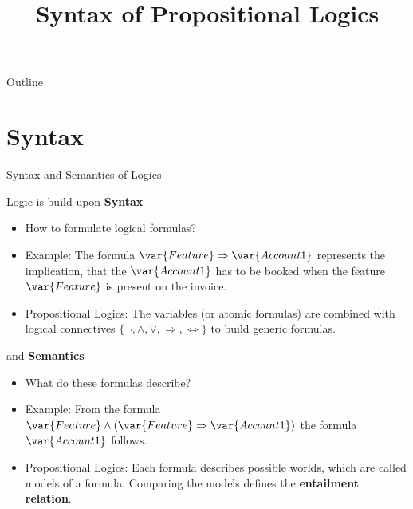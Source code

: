 \documentclass{beamer}
\title[Syntax of Propositional Logics]{
    \coursechapterone \\
    {\huge Syntax of Propositional Logics}
}
\begin{document}
{\frame[plain]{\titlepage}}
    \begin{frame}{Outline}
        \tableofcontents
    \end{frame}

    \addtocounter{framenumber}{-1}


        \section{Syntax}

    \begin{frame}{Syntax and Semantics of Logics}

        Logic is build upon
        \textbf{Syntax}
        \begin{itemize}
            \item How to formulate logical formulas?
            \item Example: The formula $\var{Feature}\Rightarrow\var{Account 1}$ represents the implication, that the $\var{Account 1}$ has to be booked when the feature $\var{Feature}$ is present on the invoice.
            \item Propositional Logics: The variables (or atomic formulas) are combined with logical connectives $\{\lnot, \land, \lor, \Rightarrow, \Leftrightarrow\}$ to build generic formulas.
        \end{itemize}
        and \textbf{Semantics}
        \begin{itemize}
            \item What do these formulas describe?
            \item Example: From the formula $\var{Feature}\land(\var{Feature}\Rightarrow\var{Account 1})$ the formula $\var{Account 1}$ follows.
            \item Propositional Logics: Each formula describes possible worlds, which are called models of a formula. Comparing the models defines the \textbf{entailment relation}.
        \end{itemize}
        
    \end{frame}
\end{document}
